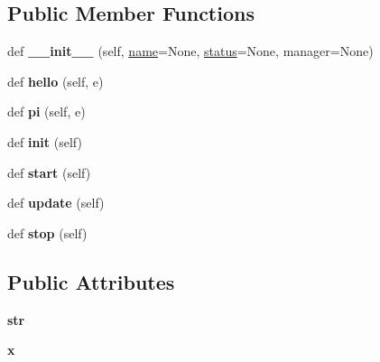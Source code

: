\subsection*{Public Member Functions}
\begin{DoxyCompactItemize}
\item 
\mbox{\label{classelma_1_1test_1_1test__process_1_1TestProcess_a84bfdbfccb64a0936b5ebefe85adf1a9}} 
def {\bfseries \+\_\+\+\_\+init\+\_\+\+\_\+} (self, \hyperlink{classelma_1_1api_1_1process_1_1Process_affa061fab12e699d4d04471bfaf52a1a}{name}=None, \hyperlink{classelma_1_1api_1_1process_1_1Process_a6dc2725cd3d032b3ec80e0fc6c52a994}{status}=None, manager=None)
\item 
\mbox{\label{classelma_1_1test_1_1test__process_1_1TestProcess_af89f2474553f0246a4a71aa5abc6c038}} 
def {\bfseries hello} (self, e)
\item 
\mbox{\label{classelma_1_1test_1_1test__process_1_1TestProcess_afc1162f9234c83f55a942fc50acc921e}} 
def {\bfseries pi} (self, e)
\item 
\mbox{\label{classelma_1_1test_1_1test__process_1_1TestProcess_a26a44df47fb0758cf808c9efe4c39bfc}} 
def {\bfseries init} (self)
\item 
\mbox{\label{classelma_1_1test_1_1test__process_1_1TestProcess_a4475739a2b7898dd5d138cc7c59879d9}} 
def {\bfseries start} (self)
\item 
\mbox{\label{classelma_1_1test_1_1test__process_1_1TestProcess_a55c1cee8682fe48db1649fd1f1aa603f}} 
def {\bfseries update} (self)
\item 
\mbox{\label{classelma_1_1test_1_1test__process_1_1TestProcess_a2c4a784c3c7531220cf114f6bf84b5af}} 
def {\bfseries stop} (self)
\end{DoxyCompactItemize}
\subsection*{Public Attributes}
\begin{DoxyCompactItemize}
\item 
\mbox{\label{classelma_1_1test_1_1test__process_1_1TestProcess_a206dcaf5ce8086f6ddc812c5d5c06ff7}} 
{\bfseries str}
\item 
\mbox{\label{classelma_1_1test_1_1test__process_1_1TestProcess_a2c109ab29963b2037822f52a3ec93784}} 
{\bfseries x}
\end{DoxyCompactItemize}



